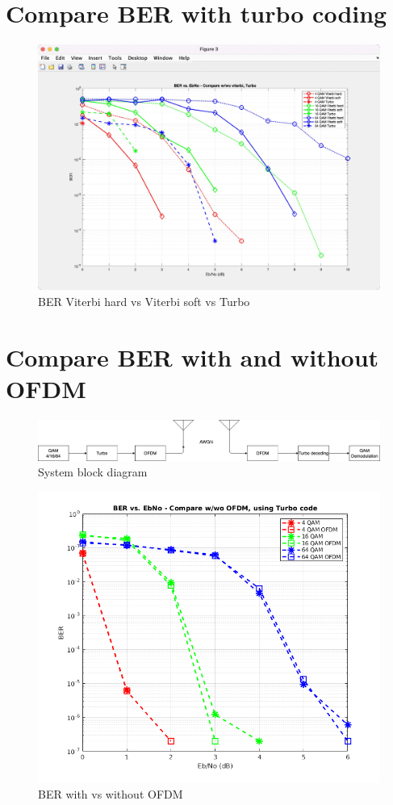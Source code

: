 \documentclass[12pt]{article}
\begin{document}
\section{Compare BER with turbo coding}


\begin{figure}[ht]
    \includegraphics[width=\textwidth]{turbo}
    \caption{BER Viterbi hard vs Viterbi soft vs Turbo}
\end{figure}

\section{Compare BER with and without OFDM}
\begin{figure}[ht]
    \includegraphics[width=\textwidth]{systemblock}
    \caption{System block diagram}
\end{figure}





\begin{figure}[ht]
    \includegraphics[width=\textwidth]{test_qam_M_turbo_OFDM_2}
    \caption{BER with vs without OFDM}
\end{figure}
\end{document}
